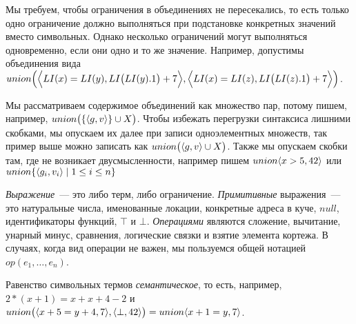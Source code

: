 \begin{remk*}
Мы требуем, чтобы ограничения в объединениях не пересекались, то есть только одно ограничение должно выполняться при подстановке конкретных значений вместо символьных. Однако несколько ограничений могут выполняться одновременно, если они  одно и то же значение. Например, допустимы объединения вида $union\Big(\Big\langle LI(x)=LI(y), LI\big(LI(y).1\big) + 7\Big\rangle, \Big\langle LI(x)=LI(z), LI\big(LI(z).1\big) + 7\Big\rangle\Big)$.

Мы рассматриваем содержимое объединений как множество пар, потому пишем, например, $union\big(\{\langle g, v\rangle\}\cup X\big)$. Чтобы избежать перегрузки синтаксиса лишними скобками, мы опускаем их далее при записи одноэлементных множеств, так пример выше можно записать как $union\big(\langle g, v\rangle\cup X\big)$. Также мы опускаем скобки там, где не возникает двусмысленности, например пишем $union\langle x>5, 42\rangle$ или $union\{\langle g_i, v_i\rangle\mid 1 \le i \le n\}$
\end{remk*}

\emph{Выражение}~--- это либо терм, либо ограничение. \emph{Примитивные} выражения~--- это натуральные числа, именованные локации, конкретные адреса в куче, $null$, идентификаторы функций, $\top$ и $\bot$. \emph{Операциями} являются сложение, вычитание, унарный минус, сравнения, логические связки и взятие элемента кортежа. В случаях, когда вид операции не важен, мы пользуемся общей нотацией $op(e_1, \ldots, e_n)$.

\begin{remk*}
Равенство символьных термов \emph{семантическое}, то есть, например, $2 * (x + 1) = x + x + 4 - 2$ и $union\big(\langle x+5=y+4, 7\rangle,\langle\bot, 42\rangle\big)=union{\langle x+1=y, 7\rangle}$.
\end{remk*}

